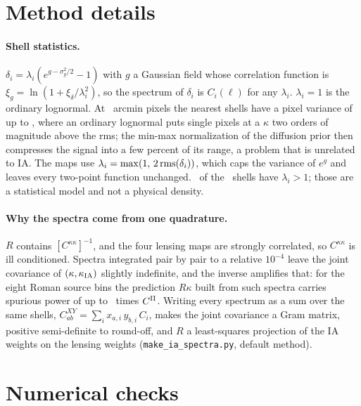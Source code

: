 \documentclass[11pt]{article}
\newcommand{\kIA}{\kappa_{\rm IA}}
\newcommand{\Ckk}{C^{\kappa\kappa}}
\newcommand{\CII}{C^{\rm II}}
\begin{document}
\appendix

\section{Method details}
\label{app:method}

\paragraph{Shell statistics.}
$\delta_i = \lambda_i\left(e^{g - \sigma_g^2/2} - 1\right)$ with $g$ a Gaussian field whose
correlation function is $\xi_g = \ln\left(1 + \xi_\delta/\lambda_i^2\right)$, so the spectrum
of $\delta_i$ is $C_i(\ell)$ for any $\lambda_i$. $\lambda_i = 1$ is the ordinary lognormal. At
\PixArcmin\ arcmin pixels the nearest shells have a pixel variance of up to \ShellVarMax, where an
ordinary lognormal puts single pixels at a $\kappa$ two orders of magnitude above the rms; the min-max normalization of the diffusion prior then compresses the signal into a
few percent of its range, a problem that is unrelated to IA. The maps use
$\lambda_i = \max(1,\, 2\,{\rm rms}(\delta_i))$, which caps the variance of $e^{g}$ and leaves
every two-point function unchanged. \NShellsShifted\ of the \NShells\ shells have
$\lambda_i > 1$; those are a statistical model and not a physical density.

\paragraph{Why the spectra come from one quadrature.}
$R$ contains $[\Ckk]^{-1}$, and the four lensing maps are strongly correlated, so $\Ckk$ is
ill conditioned. Spectra integrated pair by pair to a relative $10^{-4}$ leave the joint
covariance of $(\kappa, \kIA)$ slightly indefinite, and the inverse amplifies that: for the
eight Roman source bins the prediction $R\kappa$ built from such spectra carries spurious power
of up to \RomanSpuriousMax\ times $\CII$. Writing every spectrum as a sum over the same shells,
$C^{XY}_{ab} = \sum_i x_{a,i}\,y_{b,i}\,C_i$, makes the joint covariance a Gram matrix,
positive semi-definite to round-off, and $R$ a least-squares projection of the IA weights on
the lensing weights (\texttt{make\_ia\_spectra.py}, default method).

\section{Numerical checks}
\label{app:checks}
\end{document}

